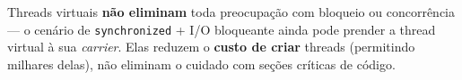 \begin{cuidado}
Threads virtuais \textbf{não eliminam} toda preocupação com bloqueio ou
concorrência --- o cenário de \texttt{synchronized} + I/O bloqueante
ainda pode prender a thread virtual à sua \textit{carrier}. Elas reduzem
o \textbf{custo de criar} threads (permitindo milhares delas), não
eliminam o cuidado com seções críticas de código.
\end{cuidado}
